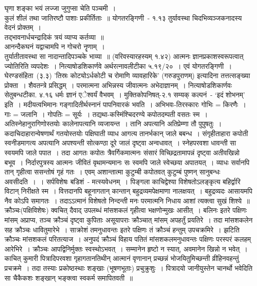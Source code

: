 घृणा शङ्का भयं लज्जा जुगुप्सा चेति पञ्चमी~।\\ कुलं शीलं तथा जातिरष्टौ पाशाः प्रकीर्तिताः~॥
योगतरङ्गिणी~- १.१३
तुर्यावस्था चिदभिव्यञ्जकनादस्य वेदनं प्रोक्तम्~।\\ तद्भावनार्धचन्द्रादिकं त्रयं व्याप्य कर्तव्या~॥\\ आनन्दैकघनं यद्वाचामपि न गोचरो नॄणाम्~।\\ तुर्यातीतावस्था सा नादान्तादिपञ्चके भाव्या~॥ (वरिवस्यारहस्यम् १.४२)
आत्मनः ज्ञानप्रकाशस्वरूपत्वात् ज्योतिरिति व्यपदेशः~।
नित्याषोडशिकार्णवे  अर्थरत्नावलीटीका ५.१९/२०~। एवं योगतरङ्गिणी~।
घेरण्डसंहिता~(३.३)
'तिस्रः कोट्योऽर्धकोटी च रोमाणि व्यावहारिके’ (गरुडपुराणम्) इत्यादिना तत्तत्सङ्ख्या प्रोक्ता~।
शैवतन्त्रे प्रसिद्धम्~।
परमात्मना अभिन्नस्य जीवात्मनः अभेदाज्ञानम्~।
नित्याषोडशिकार्णवः सेतुबन्धटीका. ४.१६
धर्मः ज्ञानं एेश्वर्यं वैभवम्~।
मुक्तिकोपनिषत्-२.१
सम्यक् कल्पनं~- ‘इदं शोभनम्’ इति~। 
मदीयत्वभिमानः
गङ्गादितीर्थस्नानं पापनिवारकं भवति~।
अभिभवः-तिरस्कारः
गोभिः = किरणैः~। गाः = जलानि~। गोपतिः = सूर्यः~।
तद्यथा-कस्मिंश्चिदरण्ये कपोतदम्पती वसतः स्म~। अतिस्नेहानुरागिणोस्तयोः कालेनापत्यानि व्यजायन्त~। तानि अपत्यानि अतिप्रेम्णा तौ पुपुषतुः~। कदाचिदाहारान्वेषणार्थं गतयोस्तयोः पक्षिघाती व्याध आगत्य तानर्भकान् जाले बबन्ध~। संगृहीताहारा कपोती स्वनीडमागत्य अपत्यानि अपश्यन्ती सोत्कण्ठा दूरे जालं दृष्ट्वा अन्वधावत्~। स्नेहपरवशा धावन्ती सा स्वयमपि जाले पपात~। तदा आगतः कपोतः त्रैवर्गिकमात्मनः संसारं विच्छिद्रतामापन्नं दृष्ट्वा अतीवखिन्नो बभूव~। निर्दारपुत्रस्य आत्मनः जीवितं वृथामन्यमानः सः स्वमपि जाले स्वेच्छया अपातयत्~। व्याधः सर्वानपि तान् गृहीत्वा ससन्तोषं गृहं गतः~। एवम् अशान्तात्मा कुटुम्बी कपोतवत् कुटुम्बं पुष्णन् सानुबन्धः अवसीदति~।~।
सर्पविशेषः
बडिशं~- मत्स्यवेधनम्~।
पिङ्गला काचिद्वेश्या विशेषतोऽलङ्कृत्य बहिर्द्वारि विटान् निरीक्षते स्म~। वित्तदानपि बहूनागतान् कान्तान् बहुद्रव्यमपेक्षमाणा नालक्षयत्~। बहुद्रव्यदः आसायमपि नैव कोऽपि समागतः~। तदाऽऽत्मानं विशेषतो निन्दन्ती मनः परमात्मनि निधाय आशां त्यक्त्वा सुखं शिश्ये~॥
क्रौञ्चः(पक्षिविशेषः) क्वचित् दैवाद् उपलब्धं मांसशकलं गृहीत्वा भक्षणोन्मुखः आसीत्~। बलिनः इतरे पक्षिणः मांसम् अप्राप्य, तञ्च क्रौञ्चं दृष्ट्वा कुपिताः असूयापराः क्रौञ्चात् मांसम् अपहर्तुं प्रयतिरे~। तदा मांसशकलेन सह क्रौञ्चः धावितुमारेभे~। साक्रोशं तमनुधावन्तः इतरे पक्षिणः तं क्रौञ्चं हन्तुम् उपचक्रमिरे~। झटिति क्रौञ्चः मांसशकलं परितत्याज~। अनुपदं क्रौञ्चं विहाय पतितं मांसशकलमनुधावन्तः पक्षिणः परस्परं कलहम् आरेभिरे~। क्रौञ्चः आपद्विनिर्मुक्तः स्वस्थोऽभवत्~।
सम्मानेन हृष्टो न स्यात्, अवमानेन खिन्नो न भवेत्~।
काचित् कुमारी पित्रादिपरवशा गृहागतानतिथीन्  आत्मानं वृणानान् प्रच्छन्नं भोजयितुमिच्छन्ती व्रीहिनवहन्तुं प्रचक्रमे~। तदा तस्याः प्रकोष्ठस्थाः शङ्खाः (भूषणभूताः) प्रचुक्रुशुः~। पित्रादयो जानीयुस्तेन चानर्थो भवेदिति सा चैकैकशः शङ्खान् भङ्क्त्वा स्वकर्म समापितवती~॥
